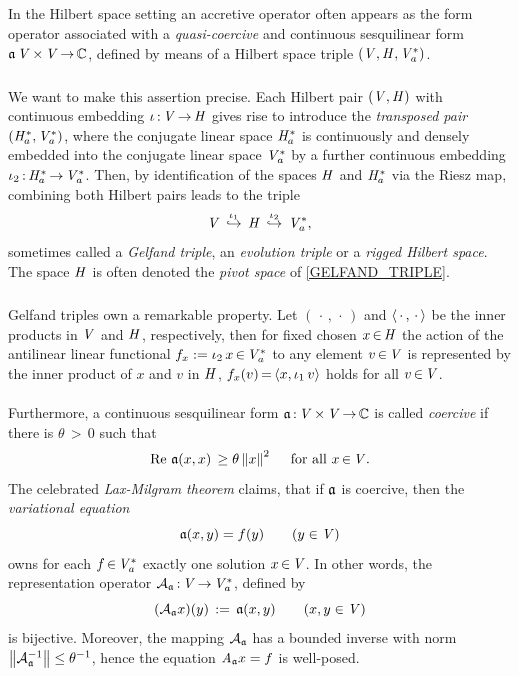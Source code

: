 \documentclass[11pt,twoside]{article}
\begin{document}
\subsection{} %
In the Hilbert space setting an accretive operator often appears as
the form operator associated
with a \textit{quasi-coercive} and continuous sesquilinear form
$\mathfrak{a}\, \mathit{V} {\,\times\,} \mathit{V} {\,\to\,} {\mathbb{C}}$,
defined by means of a Hilbert space triple $(\mathit{V},\mathit{H},\mathit{V}_a^*)$.

\subparagraph{} %
We want to make this assertion precise.
Each Hilbert pair $(\mathit{V},\mathit{H})$ with continuous embedding
$\iota {\,:\,} \mathit{V} {\,\to\,} \mathit{H}$
gives rise to introduce the \textit{transposed pair} $(\mathit{H}_a^*,\mathit{V}_a^*)$,
where the conjugate linear space $\mathit{H}_a^*$
is continuously and densely embedded into
the conjugate linear space $\mathit{V}_a^*$
by a further continuous embedding $\iota_2 {\,:\,} \mathit{H}_a^* {\,\to\,} \mathit{V}_a^*$.
Then,
by identification of the spaces $\mathit{H}$ and $\mathit{H}_a^*$
via the {Riesz} map,
combining both Hilbert pairs leads to the triple
\begin{equation}\label{GELFAND_TRIPLE}
\mathit{V} \, \overset{\iota_1}{\hookrightarrow} \,
\mathit{H} \, \overset{\iota_2}{\hookrightarrow} \, \mathit{V}_a^*,
\end{equation}
sometimes called a \textit{Gelfand triple},
an \textit{evolution triple} or a \textit{rigged Hilbert space}.
The space $\mathit{H}$ is often denoted the \textit{pivot space}
of \eqref{GELFAND_TRIPLE}.

\subparagraph{} %
Gelfand triples own a remarkable property.
Let $(\,\cdot\,,\,\cdot\,)$ and $\langle \,\cdot\,,\,\cdot\, \rangle$
be the inner products in $\mathit{V}$ and $\mathit{H}$,
respectively,
then for fixed chosen $x {\,\in\,} \mathit{H}$
the action of the antilinear linear functional
$f_x := \iota_2 \, x {\,\in\,} \mathit{V}_a^*$ to any element $v {\,\in\,} \mathit{V}$
is represented by the inner product of $x$ and $v$ in $\mathit{H}$,
{\ie} $f_x(v) {\,=\,} \langle x,\iota_1 \, v \rangle$ holds for all $v {\,\in\,} \mathit{V}$.

\paragraph{} %
Furthermore,
a continuous sesquilinear form $\mathfrak{a} {\,:\,} \mathit{V} {\,\times\,} \mathit{V} {\,\to\,} {\mathbb{C}}$
is called \textit{coercive}
if there is $\theta {\,>\,} 0$ such that
\[
\operatorname{Re} \, \mathfrak{a}(x,x) \, \geq \theta \left\lVert x \right\rVert^2
\quad \mbox{ for all } x {\,\in\,} \mathit{V}.
\]
The celebrated \textit{Lax-Milgram theorem} claims,
that if $\mathfrak{a}$ is coercive,
then the \textit{variational equation}
\[
\mathfrak{a}(x,y) = f(y) \quad \quad (y \in \mathit{V})
\]
owns for each $f {\,\in\,} \mathit{V}_a^*$ exactly one solution $x {\,\in\,} \mathit{V}$.
In other words,
the representation operator ${\mathcal{A}}_{\mathfrak{a}} {\,:\,} \mathit{V} {\,\to\,} \mathit{V}_a^*$,
defined by 
\[
({\mathcal{A}}_{\mathfrak{a}}x)(y) \,:=\, \mathfrak{a}(x,y) \quad \quad (x,y \in \mathit{V})
\]
is bijective.
Moreover,
the mapping ${\mathcal{A}}_{\mathfrak{a}}$ has a bounded inverse
with norm $\left\lVert {\mathcal{A}}_{\mathfrak{a}}^{-1} \right\rVert \leq \theta^{-1}$,
hence the equation $\mathit{A}_{\mathfrak{a}} x = f$ is well-posed.
\end{document}
